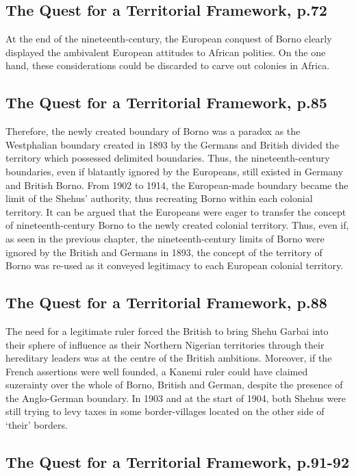 \documentclass[12pt]{article}
\begin{document}
\subsection{The Quest for a Territorial Framework, p.72}

At the end of the nineteenth-century, the European conquest of Borno clearly
displayed the ambivalent European attitudes to African polities. On the one
hand, these considerations could be discarded to carve out colonies in Africa.

\subsection{The Quest for a Territorial Framework, p.85}

Therefore, the newly created boundary of Borno was a paradox as the Westphalian
boundary created in 1893 by the Germans and British divided the territory which
possessed delimited boundaries. Thus, the nineteenth-century boundaries, even if
blatantly ignored by the Europeans, still existed in Germany and British Borno.
From 1902 to 1914, the European-made boundary became the limit of the Shehus'
authority, thus recreating Borno within each colonial territory. It can be
argued that the Europeans were eager to transfer the concept of
nineteenth-century Borno to the newly created colonial territory. Thus, even
if, as seen in the previous chapter, the nineteenth-century limits of Borno were
ignored by the British and Germans in 1893, the concept of the territory of
Borno was re-used as it conveyed legitimacy to each European colonial territory.

\subsection{The Quest for a Territorial Framework, p.88}

The need for a legitimate ruler forced the British to bring Shehu Garbai into
their sphere of influence as their Northern Nigerian territories through their
hereditary leaders was at the centre of the British ambitions. Moreover, if the
French assertions were well founded, a Kanemi ruler could have claimed
suzerainty over the whole of Borno, British and German, despite the presence of
the Anglo-German boundary. In 1903 and at the start of 1904, both Shehus were
still trying to levy taxes in some border-villages located on the other side of
`their' borders. 

\subsection{The Quest for a Territorial Framework, p.91-92}
\end{document}
